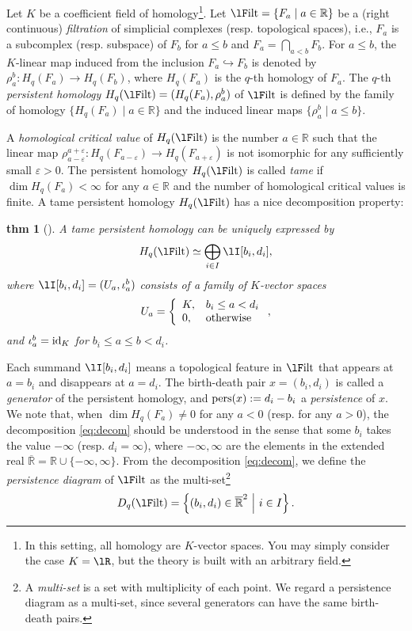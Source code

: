\documentclass{article}
\newtheorem{thm}{thm}[section]
\newcommand{\ee}{{\varepsilon}}
\newcommand{\Filt}{{\rm {\lF}ilt}}
\newcommand{\pers}{{\rm pers}}
\newcommand{\id}{{\rm id}}
\newcommand{\lmid}{ \ \middle| \ }
\providecommand{\rl}[1]{\left\{ #1 \right\}}
\begin{document}
Let $K$ be a coefficient field of homology\footnote{In this setting, all homology are $K$-vector spaces.
You may simply consider the case $K=\lR$, but the theory is built with an arbitrary field.}.
Let $\Filt=\{F_a\mid a\in\mathbb{R}\}$ be a (right continuous) {\em filtration} of simplicial complexes (resp. topological spaces), i.e., $F_a$ is a subcomplex (resp. subspace) of $F_b$ for $a\leq b$ and $F_{a}=\bigcap_{a<b}F_{b}$.
For $a\leq b$, the $K$-linear map induced from the inclusion $F_a\hookrightarrow F_b$ is denoted by $\rho^b_a: H_q(F_a)\rightarrow H_q(F_b)$, where $H_{q}(F_{a})$ is the $q$-th homology of $F_{a}$.
The $q$-th {\em persistent homology} $H_q(\Filt)=(H_q(F_a),\rho^b_a)$ of $\Filt$ is defined by the family of homology $\{H_q(F_a)\mid a\in\mathbb{R}\}$ and the induced linear maps $\{ \rho^b_a \mid a\leq b \}$. 

A {\em homological critical value} of $H_q(\Filt)$ is the number $a\in\mathbb{R}$ such that the linear map $\rho^{a+\ee}_{a-\ee}: H_q(F_{a-\ee})\rightarrow H_q(F_{a+\ee})$ is not isomorphic for any sufficiently small $\ee>0$.
The persistent homology $H_q(\Filt)$ is called {\em tame} if $\dim H_q(F_a)<\infty$ for any $a\in\mathbb{R}$ and the number of homological critical values is finite. A tame persistent homology $H_q(\Filt)$ has a nice decomposition property:
\begin{thm}[\cite{ZC05}]\label{thm:decomposition}
A tame persistent homology can be uniquely expressed by
\begin{align}\label{eq:decom}
H_q(\Filt)\simeq\bigoplus_{i\in I} \lI[b_i,d_i],
\end{align}
where $\lI[b_i,d_i]=(U_a,\iota^b_a)$ consists of a family of $K$-vector spaces
\begin{align*}
U_a=\left\{\begin{array}{ll}
K,&b_i\leq a < d_i\\
0,&{\rm otherwise}
\end{array}\right.,
\end{align*}
and $\iota^b_a=\id_{K}$ for $b_i\leq a \leq b<d_i$.
\end{thm}

Each summand $\lI[b_i,d_i]$ means a topological feature in $\Filt$ that appears at $a=b_{i}$ and disappears at $a=d_{i}$.
The birth-death pair $x=(b_i,d_i)$ is called a {\em generator} of the persistent homology, and $\pers(x):=d_{i}-b_{i}$ a {\em persistence} of $x$.
We note that, when $\dim H_q(F_a) \neq 0$ for any $a<0$ (resp. for any $a>0$), the decomposition \eqref{eq:decom} should be understood in the sense that some $b_i$ takes the value $-\infty$ (resp. $d_i=\infty$), where $-\infty,\infty$ are the elements in the extended real $\overline{\mathbb{R}}=\mathbb{R}\cup\{-\infty,\infty\}$.
From the decomposition \eqref{eq:decom}, we define the {\em persistence diagram} of $\Filt$ as the multi-set\footnote{A {\em multi-set} is a set with multiplicity of each point.
We regard a persistence diagram as a multi-set, since several generators can have the same birth-death pairs.}
\begin{align*}
D_q(\Filt)=\rl{ (b_i,d_i)\in\overline{\mathbb{R}}^2 \lmid i\in I}.
\end{align*}
\end{document}
